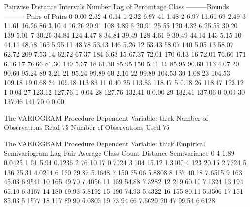 \documentclass{article}
\begin{document}
\begin{Woutput}
               Pairwise Distance Intervals
                                     Number
  Lag                                    of    Percentage
Class    ---------Bounds---------     Pairs      of Pairs
    0          0.00          2.32         4        0.14%
    1          2.32          6.97        41        1.48%
    2          6.97         11.61        69        2.49%
    3         11.61         16.26        86        3.10%
    4         16.26         20.91       108        3.89%
    5         20.91         25.55       120        4.32%
    6         25.55         30.20       139        5.01%
    7         30.20         34.84       124        4.47%
    8         34.84         39.49       128        4.61%
    9         39.49         44.14       143        5.15%
   10         44.14         48.78       165        5.95%
   11         48.78         53.43       146        5.26%
   12         53.43         58.07       140        5.05%
   13         58.07         62.72       209        7.53%
   14         62.72         67.37       184        6.63%
   15         67.37         72.01       170        6.13%
   16         72.01         76.66       171        6.16%
   17         76.66         81.30       149        5.37%
   18         81.30         85.95       150        5.41%
   19         85.95         90.60       113        4.07%
   20         90.60         95.24        89        3.21%
   21         95.24         99.89        60        2.16%
   22         99.89        104.53        30        1.08%
   23        104.53        109.18        19        0.68%
   24        109.18        113.83        11        0.40%
   25        113.83        118.47         5        0.18%
   26        118.47        123.12         1        0.04%
   27        123.12        127.76         1        0.04%
   28        127.76        132.41         0        0.00%
   29        132.41        137.06         0        0.00%
   30        137.06        141.70         0        0.00%

The VARIOGRAM Procedure
Dependent Variable: thick
Number of Observations Read          75
Number of Observations Used          75

The VARIOGRAM Procedure
Dependent Variable: thick
        Empirical Semivariogram
  Lag      Pair     Average
Class     Count    Distance     Semivariance
    0         4        1.89     0.0425
    1        51        5.94     0.1236
    2        76       10.17     0.7024
    3       104       15.12     1.3100
    4       123       20.15     2.7324
    5       136       25.31     4.0214
    6       130       29.87     5.1648
    7       150       35.06     5.8808
    8       137       40.18     7.6515
    9       163       45.03     6.9541
   10       165       49.70     7.4056
   11       159       54.88     7.3282
   12       219       60.10     7.1324
   13       194       65.10     6.3167
   14       180       69.93     5.8192
   15       190       74.93     5.4322
   16       155       80.11     5.3506
   17       151       85.03     5.1577
   18       117       89.90     6.0803
   19        73       94.66     7.6629
   20        47       99.54     6.6128


\end{Woutput}
\end{document}
